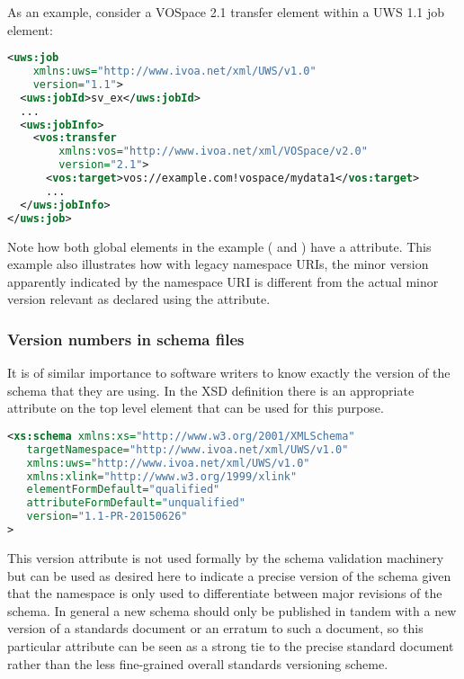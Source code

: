 \documentclass[10pt,a4paper]{ivoa}
\begin{document}
As an example, consider a VOSpace 2.1 transfer element within a UWS 1.1
job element:

\begin{lstlisting}[language=xml]
<uws:job 
    xmlns:uws="http://www.ivoa.net/xml/UWS/v1.0" 
    version="1.1">
  <uws:jobId>sv_ex</uws:jobId>
  ...
  <uws:jobInfo>
    <vos:transfer 
        xmlns:vos="http://www.ivoa.net/xml/VOSpace/v2.0"
        version="2.1">
      <vos:target>vos://example.com!vospace/mydata1</vos:target>
      ...
  </uws:jobInfo>
</uws:job>
\end{lstlisting}

Note how both global elements in the example ( and
) have a  attribute.  This example
also illustrates how with legacy namespace URIs, the minor version
apparently indicated by the namespace URI is different from the actual
minor version relevant as declared using the  attribute.


\subsubsection{Version numbers in schema files}
It is of similar importance to software writers to know exactly the version of
the schema that they are using. In the XSD definition there is an appropriate
 attribute on the top level  element that can be
used for this purpose.

\begin{lstlisting}[language=XML]
<xs:schema xmlns:xs="http://www.w3.org/2001/XMLSchema"
   targetNamespace="http://www.ivoa.net/xml/UWS/v1.0"
   xmlns:uws="http://www.ivoa.net/xml/UWS/v1.0"
   xmlns:xlink="http://www.w3.org/1999/xlink" 
   elementFormDefault="qualified"
   attributeFormDefault="unqualified"
   version="1.1-PR-20150626"
>
\end{lstlisting}

This version attribute is not used formally by the schema validation machinery
but can be used as desired here to indicate a precise version of the schema
given that the namespace is only used to differentiate between major revisions
of the schema. In general a new schema should only be published in tandem with a 
new version of a standards document or an erratum to such a document, so this 
particular  attribute can be seen as a strong tie to the precise
standard document rather than the less fine-grained overall standards versioning
scheme.
\end{document}
